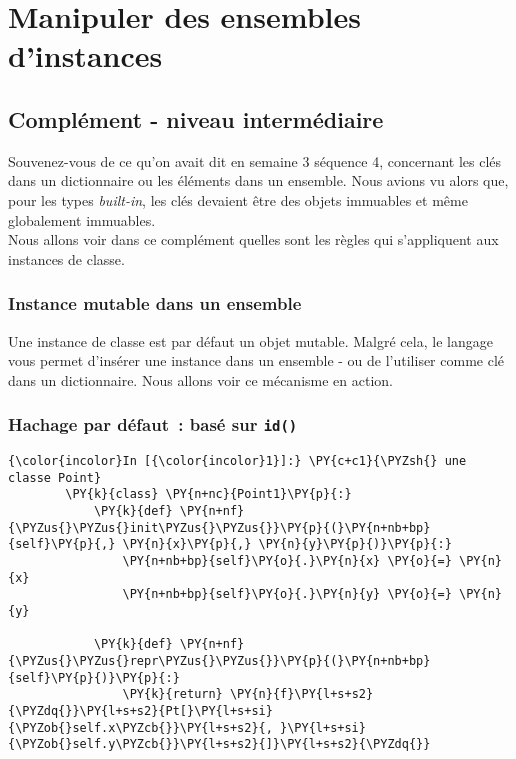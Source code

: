     \hypertarget{manipuler-des-ensembles-dinstances}{%
\section{Manipuler des ensembles
d'instances}\label{manipuler-des-ensembles-dinstances}}

    \hypertarget{compluxe9ment---niveau-intermuxe9diaire}{%
\subsection{Complément - niveau
intermédiaire}\label{compluxe9ment---niveau-intermuxe9diaire}}

    Souvenez-vous de ce qu'on avait dit en semaine 3 séquence 4, concernant
les clés dans un dictionnaire ou les éléments dans un ensemble. Nous
avions vu alors que, pour les types \emph{built-in}, les clés devaient
être des objets immuables et même globalement immuables.\\

    Nous allons voir dans ce complément quelles sont les règles qui
s'appliquent aux instances de classe.

    \hypertarget{instance-mutable-dans-un-ensemble}{%
\subsubsection{Instance mutable dans un
ensemble}\label{instance-mutable-dans-un-ensemble}}

    Une instance de classe est par défaut un objet mutable. Malgré cela, le
langage vous permet d'insérer une instance dans un ensemble - ou de
l'utiliser comme clé dans un dictionnaire. Nous allons voir ce mécanisme
en action.

    \hypertarget{hachage-par-duxe9faut-basuxe9-sur-id}{%
\subsubsection{\texorpdfstring{Hachage par défaut~: basé sur
\texttt{id()}}{Hachage par défaut~: basé sur id()}}\label{hachage-par-duxe9faut-basuxe9-sur-id}}

    \begin{Verbatim}[commandchars=\\\{\}]
{\color{incolor}In [{\color{incolor}1}]:} \PY{c+c1}{\PYZsh{} une classe Point}
        \PY{k}{class} \PY{n+nc}{Point1}\PY{p}{:}
            \PY{k}{def} \PY{n+nf}{\PYZus{}\PYZus{}init\PYZus{}\PYZus{}}\PY{p}{(}\PY{n+nb+bp}{self}\PY{p}{,} \PY{n}{x}\PY{p}{,} \PY{n}{y}\PY{p}{)}\PY{p}{:}
                \PY{n+nb+bp}{self}\PY{o}{.}\PY{n}{x} \PY{o}{=} \PY{n}{x}
                \PY{n+nb+bp}{self}\PY{o}{.}\PY{n}{y} \PY{o}{=} \PY{n}{y}
                
            \PY{k}{def} \PY{n+nf}{\PYZus{}\PYZus{}repr\PYZus{}\PYZus{}}\PY{p}{(}\PY{n+nb+bp}{self}\PY{p}{)}\PY{p}{:}
                \PY{k}{return} \PY{n}{f}\PY{l+s+s2}{\PYZdq{}}\PY{l+s+s2}{Pt[}\PY{l+s+si}{\PYZob{}self.x\PYZcb{}}\PY{l+s+s2}{, }\PY{l+s+si}{\PYZob{}self.y\PYZcb{}}\PY{l+s+s2}{]}\PY{l+s+s2}{\PYZdq{}}
\end{Verbatim}


